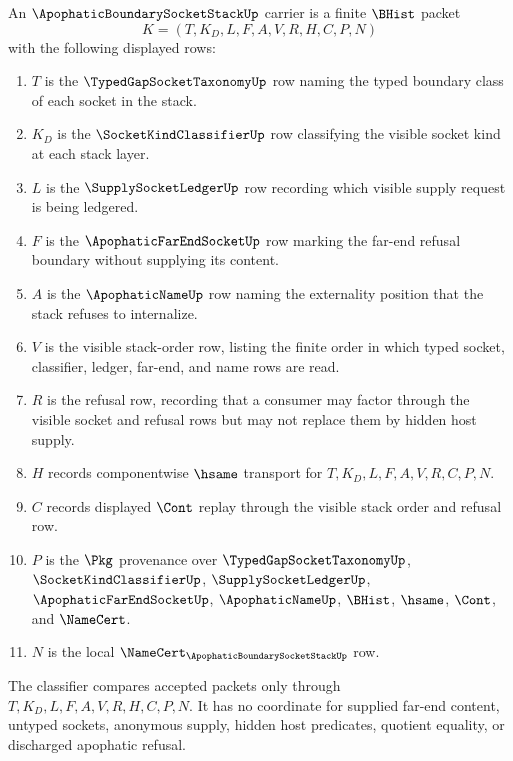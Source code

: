 \begin{definition}
\label{def:apophatic-boundary-socket-stack-carrier}
An $\ApophaticBoundarySocketStackUp$ carrier is a finite $\BHist$ packet
$$
K=(T,K_D,L,F,A,V,R,H,C,P,N)
$$
with the following displayed rows:
\begin{enumerate}
\item $T$ is the $\TypedGapSocketTaxonomyUp$ row naming the typed boundary class of each socket in the stack.
\item $K_D$ is the $\SocketKindClassifierUp$ row classifying the visible socket kind at each stack layer.
\item $L$ is the $\SupplySocketLedgerUp$ row recording which visible supply request is being ledgered.
\item $F$ is the $\ApophaticFarEndSocketUp$ row marking the far-end refusal boundary without supplying its content.
\item $A$ is the $\ApophaticNameUp$ row naming the externality position that the stack refuses to internalize.
\item $V$ is the visible stack-order row, listing the finite order in which typed socket, classifier, ledger, far-end, and name rows are read.
\item $R$ is the refusal row, recording that a consumer may factor through the visible socket and refusal rows but may not replace them by hidden host supply.
\item $H$ records componentwise $\hsame$ transport for $T,K_D,L,F,A,V,R,C,P,N$.
\item $C$ records displayed $\Cont$ replay through the visible stack order and refusal row.
\item $P$ is the $\Pkg$ provenance over $\TypedGapSocketTaxonomyUp$, $\SocketKindClassifierUp$, $\SupplySocketLedgerUp$, $\ApophaticFarEndSocketUp$, $\ApophaticNameUp$, $\BHist$, $\hsame$, $\Cont$, and $\NameCert$.
\item $N$ is the local $\NameCert_{\ApophaticBoundarySocketStackUp}$ row.
\end{enumerate}
The classifier compares accepted packets only through $T,K_D,L,F,A,V,R,H,C,P,N$. It has no coordinate for supplied far-end content, untyped sockets, anonymous supply, hidden host predicates, quotient equality, or discharged apophatic refusal.
\end{definition}

